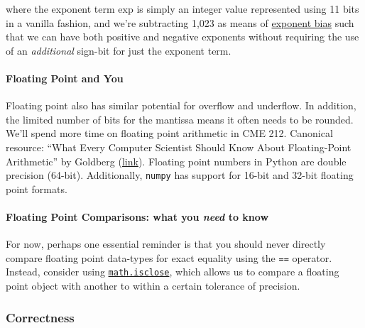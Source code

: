 \documentclass[12pt,letterpaper,twoside]{article}
\begin{document}
where the exponent term $\textrm{exp}$ is simply an integer value
represented using 11 bits in a vanilla fashion, and we're subtracting
1,023 as means of
\href{https://en.wikipedia.org/wiki/Exponent_bias}{exponent bias} such
that we can have both positive and negative exponents without
requiring the use of an \emph{additional} sign-bit for just the
exponent term.

\paragraph{Floating Point and You}
Floating point also has similar potential for overflow and underflow.
In addition, the limited number of bits for the mantissa means it
often needs to be rounded.
We'll spend more time on floating point arithmetic in CME 212.
Canonical resource: ``What Every Computer Scientist Should Know About
Floating-Point Arithmetic'' by Goldberg
(\href{https://ece.uwaterloo.ca/~dwharder/NumericalAnalysis/02Numerics/Double/paper.pdf}{link}).
Floating point numbers in Python are double precision (64-bit).
Additionally, \texttt{numpy} has support for 16-bit and 32-bit
floating point formats.

\paragraph{Floating Point Comparisons: what you \emph{need} to know}
For now, perhaps one essential reminder is that you should never
directly compare floating point data-types for exact equality using
the \texttt{==} operator. Instead, consider using
\href{https://docs.python.org/3/library/math.html#math.isclose}{\texttt{math.isclose}},
which allows us to compare a floating point object with another to
within a certain tolerance of precision.

\vspace{-2ex}
\subsubsection{Correctness}
\end{document}
